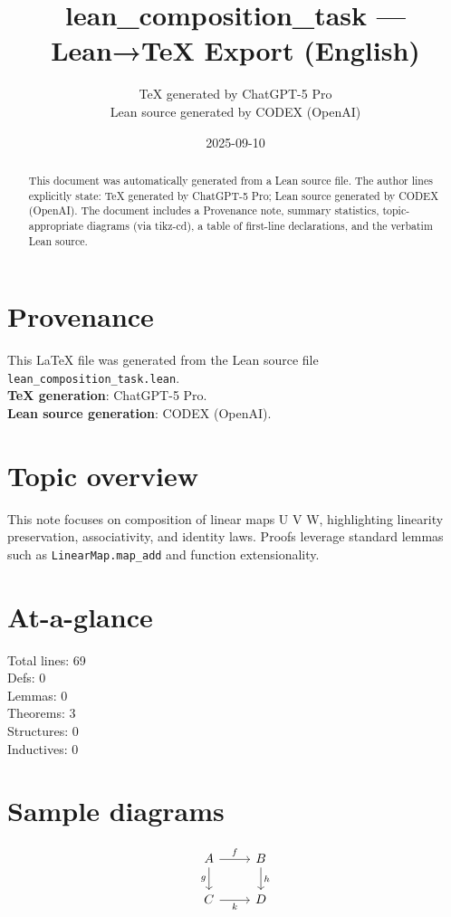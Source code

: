 \documentclass[12pt]{article}
\title{lean\_composition\_task — Lean→TeX Export (English)}
\author{TeX generated by ChatGPT-5 Pro\\Lean source generated by CODEX (OpenAI)}
\date{2025-09-10}
\begin{document}
\maketitle

\begin{abstract}
This document was automatically generated from a Lean source file. The author lines explicitly state: TeX generated by ChatGPT-5 Pro; Lean source generated by CODEX (OpenAI). The document includes a Provenance note, summary statistics, topic-appropriate diagrams (via tikz-cd), a table of first-line declarations, and the verbatim Lean source.
\end{abstract}

\section*{Provenance}
This \LaTeX{} file was generated from the Lean source file \texttt{lean\_composition\_task.lean}.\\
\textbf{TeX generation}: ChatGPT-5 Pro.\\
\textbf{Lean source generation}: CODEX (OpenAI).

\section*{Topic overview}
This note focuses on composition of linear maps U  V  W, highlighting linearity preservation, associativity, and identity laws. Proofs leverage standard lemmas such as \texttt{LinearMap.map_add} and function extensionality.

\section*{At-a-glance}
Total lines: 69\\
Defs: 0\\
Lemmas: 0\\
Theorems: 3\\
Structures: 0\\
Inductives: 0

\section*{Sample diagrams}

\[
\begin{tikzcd}
A \arrow[r, "f"] \arrow[d, "g"'] & B \arrow[d, "h"] \\
C \arrow[r, "k"'] & D
\end{tikzcd}
\]
\end{document}
